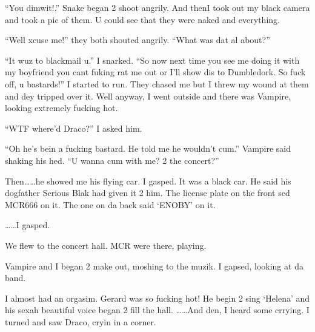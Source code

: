 \enquote{You dimwit!.} Snake began 2 shoot angrily. And then\dotfill I took out my black camera and took a pic of them. U could see that they were naked and everything.

\enquote{Well xcuse me!} they both shouted angrily. \enquote{What was dat al about?}

\enquote{It wuz to blackmail u.} I snarked. \enquote{So now next time you see me doing it with my boyfriend you cant fuking rat me out or I'll show dis to Dumbledork. So fuck off, u bastards!} I started to run. They chased me but I threw my wound at them and dey tripped over it. Well anyway, I went outside and there was Vampire, looking extremely fucking hot.

\enquote{WTF where'd Draco?} I asked him.

\enquote{Oh he's bein a fucking bastard. He told me he wouldn't cum.} Vampire said shaking his hed. \enquote{U wanna cum with me? 2 the concert?}

Then\ldots\ldots he showed me his flying car. I gasped. It was a black car. He said his dogfather Serious Blak had given it 2 him. The license plate on the front sed MCR666 on it. The one on da back said \enquote*{ENOBY} on it.

\ldots\ldots I gasped.

We flew to the concert hall. MCR were there, playing.

Vampire and I began 2 make out, moshing to the muzik. I gapsed, looking at da band.

I almost had an orgasim. Gerard was so fucking hot! He begin 2 sing \enquote*{Helena} and his sexah beautiful voice began 2 fill the hall. \ldots\ldots And den, I heard some crrying. I turned and saw Draco, cryin in a corner.

